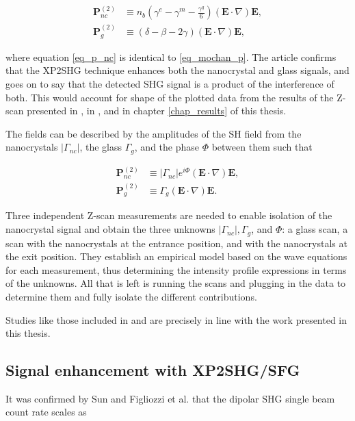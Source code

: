 \documentclass[10pt]{article}
\begin{document}
\begin{align}
\mathbf{P}^{(2)}_{nc} &\equiv n_{b}\left(\gamma^{e}-\gamma^{m}-\frac{\gamma^{q}}{6}\right)\left(\mathbf{E}\cdot\nabla\right)\mathbf{E},\label{eq_p_nc}\\
\mathbf{P}^{(2)}_{g} &\equiv \left(\delta-\beta- 2\gamma\right)\left(\mathbf{E}\cdot\nabla\right)\mathbf{E},
\end{align}

where equation \eqref{eq_p_nc} is identical to \eqref{eq_mochan_p}. The article confirms that the XP2SHG technique enhances both the nanocrystal and glass signals, and goes on to say that the detected SHG signal is a product of the interference of both. This would account for shape of the plotted data from the results of the Z-scan presented in \cite{wirth2008second}, in \cite{PhysRevB.84.165316}, and in chapter \ref{chap_results} of this thesis.

The fields can be described by the amplitudes of the SH field from the nanocrystals $\vert\Gamma_{nc}\vert$, the glass $\Gamma_{g}$, and the phase $\Phi$ between them such that

\begin{align}
\mathbf{P}^{(2)}_{nc} &\equiv \vert\Gamma_{nc}\vert e^{i\Phi}\left(\mathbf{E}\cdot\nabla\right)\mathbf{E},\\
\mathbf{P}^{(2)}_{g} &\equiv \Gamma_{g}\left(\mathbf{E}\cdot\nabla\right)\mathbf{E}.
\end{align}

Three independent Z-scan measurements are needed to enable isolation of the nanocrystal signal and obtain the three unknowns $\vert\Gamma_{nc}\vert, \Gamma_{g}$, and $\Phi$: a glass scan, a scan with the nanocrystals at the entrance position, and with the nanocrystals at the exit position. They establish an empirical model based on the wave equations for each measurement, thus determining the intensity profile expressions in terms of the unknowns. All that is left is running the scans and plugging in the data to determine them and fully isolate the different contributions.

Studies like those included in \cite{PhysRevB.84.165316} and \cite{wirth2008second} are precisely in line with the work presented in this thesis.

\subsection{Signal enhancement with XP2SHG/SFG}
It was confirmed \cite{figliozzi2005single, sun2005quadrupolar} by Sun and Figliozzi et al. that the dipolar SHG single beam count rate scales as
\end{document}
